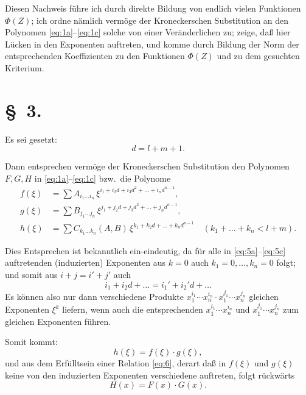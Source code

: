\documentclass[fontsize=10pt,paper=a5,pagesize,headings=small]{scrbook}
\theoremstyle{plain}
\begin{document}
Diesen Nachweis führe ich durch direkte Bildung von endlich vielen Funktionen
$\varPhi(Z)$; ich ordne nämlich vermöge der Kroneckerschen Substitution an den Polynomen
\eqref{eq:1a}--\eqref{eq:1c} solche von einer Veränderlichen zu; zeige, daß hier
Lücken in den Exponenten auftreten, und komme durch Bildung der Norm der
entsprechenden Koeffizienten zu den Funktionen $\varPhi(Z)$ und zu dem gesuchten
Kriterium.

\section*{\S~3.}
\setcounter{section}{3}

Es sei gesetzt:
\begin{equation}
\label{eq:4}
d = l + m + 1.
\end{equation}

\newpage
\setcounter{page}{414}

Dann entsprechen vermöge der Kroneckerschen Substitution den Polynomen
$F, G, H$ in \eqref{eq:1a}--\eqref{eq:1c} bzw.~die Polynome
\begin{align}
\label{eq:5a}
f(\xi) &= \sum A_{i_1\dots i_n}\, \xi^{i_1 + i_2 d + i_3 d^2 + \dots + i_n d^{n-1}},\\
\label{eq:5b}
g(\xi) &= \sum B_{j_1\dots j_n}\, \xi^{j_1 + j_2 d + j_3 d^2 + \dots + j_n d^{n-1}},\\
\label{eq:5c}
h(\xi) &= \sum C_{k_1\dots k_n}(A,B)\, \xi^{k_1 + k_2 d + \dots + k_n d^{n-1}} \quad (k_1+\dots+k_n < l+m).
\end{align}

Dies Entsprechen ist bekanntlich ein-eindeutig, da für alle in \eqref{eq:5a}--\eqref{eq:5c}
auftretenden (induzierten) Exponenten aus $k = 0$ auch $k_1 = 0,\dots,k_n = 0$
folgt; und somit aus $i+j = i'+j'$ auch
\[ i_1 + i_2 d + \dots = i_1' + i_2' d + \dots \]
Es können also nur dann verschiedene Produkte $x_1^{i_1}\cdots x_n^{i_n} \cdot x_1^{j_1}\cdots x_n^{j_n}$
gleichen Exponenten $\xi^k$ liefern, wenn auch die entsprechenden $x_1^{i_1}\cdots x_n^{i_n}$
und $x_1^{j_1}\cdots x_n^{j_n}$ zum gleichen Exponenten führen.

Somit kommt:
\begin{equation}
\label{eq:6}
h(\xi) = f(\xi) \cdot g(\xi),
\end{equation}
und aus dem Erfülltsein einer Relation \eqref{eq:6}, derart daß in $f(\xi)$ und $g(\xi)$
keine von den induzierten Exponenten verschiedene auftreten, folgt rückwärts
\begin{equation}
\label{eq:7}
H(x) = F(x) \cdot G(x).
\end{equation}
\end{document}
